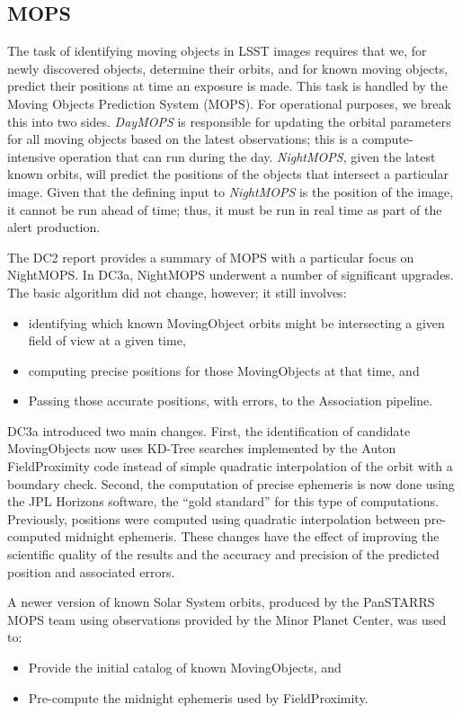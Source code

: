 
\subsection{MOPS}

The task of identifying moving objects in LSST images requires that
we, for newly discovered objects, determine their orbits, and for
known moving objects, predict their positions at time an exposure is
made.  This task is handled by the Moving Objects Prediction System
(MOPS).  For operational purposes, we break this into two sides.  {\it
  DayMOPS} is responsible for updating the orbital parameters for all
moving objects based on the latest observations; this is a 
compute-intensive operation that can run during the day.  {\it
  NightMOPS}, given the latest known orbits, will predict the
positions of the objects that intersect a particular image.  Given
that the defining input to {\it NightMOPS} is the position of the
image, it cannot be run ahead of time; thus, it must be run in real
time as part of the alert production.  

The DC2 report provides a summary of MOPS with a particular focus on
NightMOPS.  In DC3a, NightMOPS underwent a number of significant 
upgrades.  The basic algorithm did not change, however; it still involves:
\begin{itemize}
    \item identifying which known MovingObject orbits might be intersecting a 
          given field of view at a given time,
    \item computing precise positions for those MovingObjects at that
      time, and 
    \item Passing those accurate positions, with errors, to the Association 
          pipeline.
\end{itemize}

DC3a introduced two main changes.  First, the identification of
candidate MovingObjects now uses KD-Tree searches implemented by the
Auton FieldProximity code instead of simple quadratic interpolation of
the orbit with a boundary check.  Second, the computation of precise
ephemeris is now done using the JPL Horizons software, the ``gold
standard'' for this type of computations.  Previously, positions were
computed using quadratic interpolation between pre-computed midnight
ephemeris.  These changes have the effect of improving the scientific
quality of the results and the accuracy and precision of the predicted
position and associated errors. 

A newer version of known Solar System orbits, produced by the PanSTARRS MOPS 
team using observations provided by the Minor Planet Center, was used to:
\begin{itemize}
    \item Provide the initial catalog of known MovingObjects, and
    \item Pre-compute the midnight ephemeris used by FieldProximity.
\end{itemize}










